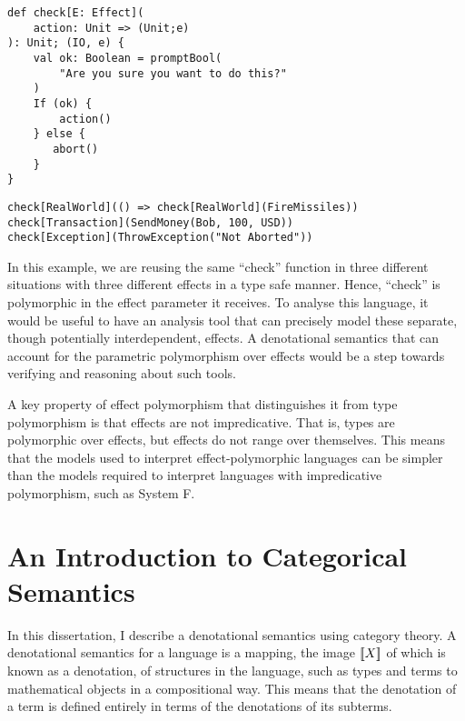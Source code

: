 \documentclass{Report}
\begin{document}
\begin{framed}
    \begin{framed}
        \begin{verbatim}
def check[E: Effect](
    action: Unit => (Unit;e)
): Unit; (IO, e) {
    val ok: Boolean = promptBool(
        "Are you sure you want to do this?"
    )
    If (ok) {
        action()
    } else {
       abort()
    }
}  
            \end{verbatim}
    \end{framed}

    \begin{framed}
        \begin{verbatim}
check[RealWorld](() => check[RealWorld](FireMissiles))
check[Transaction](SendMoney(Bob, 100, USD))
check[Exception](ThrowException("Not Aborted"))
        \end{verbatim}
    \end{framed}
\end{framed}

In this example, we are reusing the same “check” function in three different situations with three different effects in a type safe manner. Hence, “check” is polymorphic in the effect parameter it receives. To analyse this language, it would be useful to have an analysis tool that can precisely model these separate, though potentially interdependent, effects. A denotational semantics that can account for the parametric polymorphism over effects would be a step towards verifying and reasoning about such tools. 

A key property of effect polymorphism that distinguishes it from type polymorphism is that effects are not impredicative. That is, types are polymorphic over effects, but effects do not range over themselves. This means that the models used to interpret effect-polymorphic languages can be simpler than the models required to interpret languages with impredicative polymorphism, such as System F.


\section{An Introduction to Categorical Semantics}

In this dissertation, I describe a denotational semantics using category theory. A denotational semantics for a language is a mapping, the image ${\bf [\![}X{\bf ]\!]}$ of which is known as a denotation, of structures in the language, such as types and terms to mathematical objects in a compositional way. This means that the denotation of a term is defined entirely in terms of the denotations of its subterms.
\end{document}
